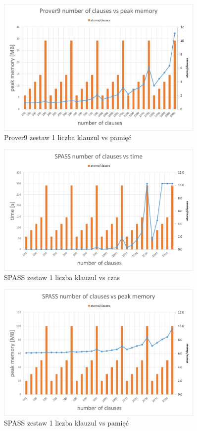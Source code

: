 \documentclass[a4paper,12pt]{article}
\begin{document}
\begin{figure}[H]
  \centerline{\includegraphics[width=0.9\textwidth]{outputs/set1/set1 charts/02 Prover9 number of clauses vs peak memory.jpg}}
  \caption{Prover9 zestaw 1 liczba klauzul vs pamięć}
\end{figure}

\begin{figure}[H]
  \centerline{\includegraphics[width=0.9\textwidth]{outputs/set1/set1 charts/11 SPASS number of clauses vs time.jpg}}
  \caption{SPASS zestaw 1 liczba klauzul vs czas}
\end{figure}

\begin{figure}[H]
  \centerline{\includegraphics[width=0.9\textwidth]{outputs/set1/set1 charts/12 SPASS number of clauses vs peak memory.jpg}}
  \caption{SPASS zestaw 1 liczba klauzul vs pamięć}
\end{figure}
\end{document}
